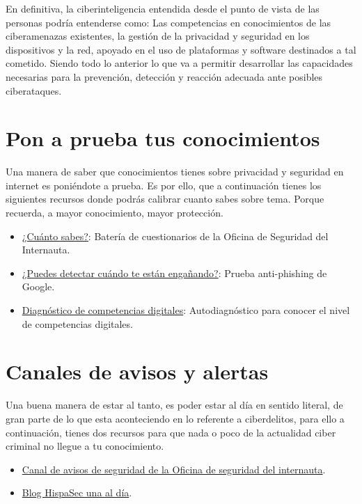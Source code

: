 \documentclass[
  spanish,
  a4paper,
  openany]{book}
\begin{document}
En definitiva, la ciberinteligencia entendida desde el punto de vista de las personas podría entenderse como: Las competencias en conocimientos de las ciberamenazas existentes, la gestión de la privacidad y seguridad en los dispositivos y la red, apoyado en el uso de plataformas y software destinados a tal cometido. Siendo todo lo anterior lo que va a permitir desarrollar las capacidades necesarias para la prevención, detección y reacción adecuada ante posibles ciberataques.

\hypertarget{pon-a-prueba-tus-conocimientos}{%
\section{Pon a prueba tus conocimientos}\label{pon-a-prueba-tus-conocimientos}}

Una manera de saber que conocimientos tienes sobre privacidad y seguridad en internet es poniéndote a prueba. Es por ello, que a continuación tienes los siguientes recursos donde podrás calibrar cuanto sabes sobre tema. Porque recuerda, a mayor conocimiento, mayor protección.

\begin{itemize}
\item
  \href{https://www.osi.es/es/cuanto-sabes}{¿Cuánto sabes?}: Batería de cuestionarios de la Oficina de Seguridad del Internauta.
\item
  \href{https://phishingquiz.withgoogle.com/?hl=es}{¿Puedes detectar cuándo te están engañando?}: Prueba anti-phishing de Google.
\item
  \href{https://www.digcomp.andaluciaesdigital.es/}{Diagnóstico de competencias digitales}: Autodiagnóstico para conocer el nivel de competencias digitales.
\end{itemize}

\hypertarget{canales-de-avisos-y-alertas}{%
\section{Canales de avisos y alertas}\label{canales-de-avisos-y-alertas}}

Una buena manera de estar al tanto, es poder estar al día en sentido literal, de gran parte de lo que esta aconteciendo en lo referente a ciberdelitos, para ello a continuación, tienes dos recursos para que nada o poco de la actualidad ciber criminal no llegue a tu conocimiento.

\begin{itemize}
\item
  \href{https://www.osi.es/es/actualidad/avisos}{Canal de avisos de seguridad de la Oficina de seguridad del internauta}.
\item
  \href{https://unaaldia.hispasec.com/}{Blog HispaSec una al día}.
\end{itemize}
\end{document}
